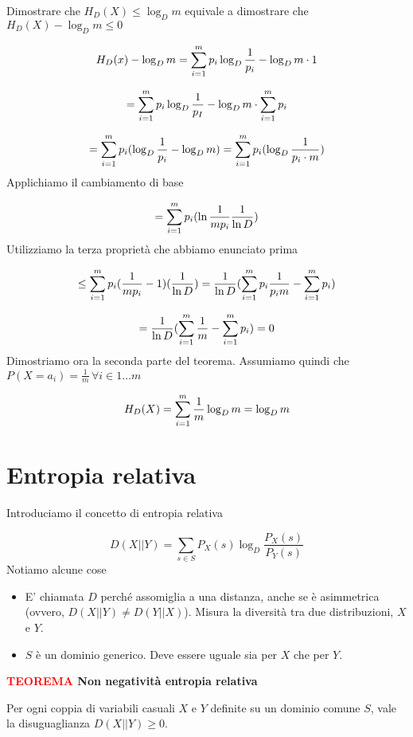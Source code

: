 \documentclass[12pt]{report}
\begin{document}
    \begin{dimo}
        Dimostrare che $H_D(X) \leq \log_D{m}$ equivale a dimostrare che $H_D(X) - \log_D{m} \leq 0$

        $$H_D(x) - \log_D{m} = \sum_{i=1}^{m} p_i \log_D{\frac{1}{p_i}} - \log_D{m} \cdot 1$$

        $$= \sum_{i=1}^{m} p_i \log_D{\frac{1}{p_I}} - \log_D{m} \cdot \sum_{i=1}^{m} p_i$$

        $$= \sum_{i=1}^{m} p_i(\log_D{\frac{1}{p_i}} - \log_D{m}) = \sum_{i=1}^{m} p_i (\log_D{\frac{1}{p_i\cdot m}})$$
        Applichiamo il cambiamento di base

        $$= \sum_{i=1}^{m} p_i (\ln{\frac{1}{m p_i}} \frac{1}{\ln{D}})$$
        Utilizziamo la terza proprietà che abbiamo enunciato prima

        $$\leq \sum_{i=1}^{m} p_i (\frac{1}{m p_i} - 1)(\frac{1}{\ln{D}}) = \frac{1}{\ln{D}} (\sum_{i=1}^{m} p_i \frac{1}{p_i m} - \sum_{i=1}^{m} p_i)$$

        $$= \frac{1}{\ln{D}} (\sum_{i=1}^{m} \frac{1}{m} - \sum_{i=1}^{m} p_i) = 0$$
        Dimostriamo ora la seconda parte del teorema. Assumiamo quindi che $P(X = a_i)  = \frac{1}{m} \, \forall i \in 1\dots m$

        $$H_D(X) = \sum_{i=1}^{m} \frac{1}{m} \log_D{m} = \log_D{m}$$

    \end{dimo}

    \section{Entropia relativa}

    Introduciamo il concetto di entropia relativa

    $$D(X || Y) = \sum_{s \in S} P_X(s) \log_D{\frac{P_X(s)}{P_Y(s)}}$$
    Notiamo alcune cose

    \begin{itemize}
        \item E' chiamata $D$ perché assomiglia a una distanza, anche se è asimmetrica (ovvero, $D(X || Y) \neq D(Y || X)$). Misura la diversità tra due distribuzioni, $X$ e $Y$.
        \item $S$ è un dominio generico. Deve essere uguale sia per $X$ che per $Y$.
    \end{itemize}


    \vspace{5px}
    \begin{tcolorbox}
        \textbf{\textcolor{red}{TEOREMA} Non negatività entropia relativa}
        \vspace{5px}
        \begin{center}
            Per ogni coppia di variabili casuali $X$ e $Y$ definite su un dominio comune $S$, vale la disuguaglianza $D(X||Y) \geq 0$.
        \end{center}
    \end{tcolorbox}
\end{document}
